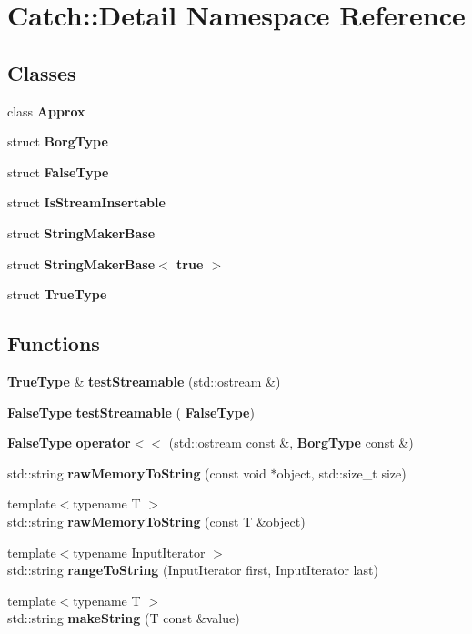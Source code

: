 \section{Catch\+:\+:Detail Namespace Reference}
\label{namespace_catch_1_1_detail}
\subsection*{Classes}
\begin{DoxyCompactItemize}
\item 
class \textbf{ Approx}
\item 
struct \textbf{ Borg\+Type}
\item 
struct \textbf{ False\+Type}
\item 
struct \textbf{ Is\+Stream\+Insertable}
\item 
struct \textbf{ String\+Maker\+Base}
\item 
struct \textbf{ String\+Maker\+Base$<$ true $>$}
\item 
struct \textbf{ True\+Type}
\end{DoxyCompactItemize}
\subsection*{Functions}
\begin{DoxyCompactItemize}
\item 
\textbf{ True\+Type} \& \textbf{ test\+Streamable} (std\+::ostream \&)
\item 
\textbf{ False\+Type} \textbf{ test\+Streamable} (\textbf{ False\+Type})
\item 
\textbf{ False\+Type} \textbf{ operator$<$$<$} (std\+::ostream const \&, \textbf{ Borg\+Type} const \&)
\item 
std\+::string \textbf{ raw\+Memory\+To\+String} (const void $\ast$object, std\+::size\+\_\+t size)
\item 
{\footnotesize template$<$typename T $>$ }\\std\+::string \textbf{ raw\+Memory\+To\+String} (const T \&object)
\item 
{\footnotesize template$<$typename Input\+Iterator $>$ }\\std\+::string \textbf{ range\+To\+String} (Input\+Iterator first, Input\+Iterator last)
\item 
{\footnotesize template$<$typename T $>$ }\\std\+::string \textbf{ make\+String} (T const \&value)
\end{DoxyCompactItemize}
